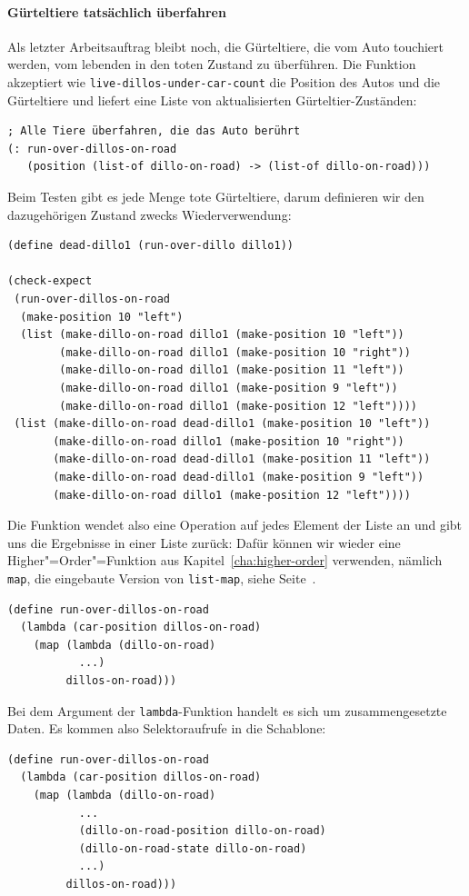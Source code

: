 \paragraph{Gürteltiere tatsächlich überfahren} Als letzter
Arbeitsauftrag bleibt noch, die Gürteltiere, die vom Auto touchiert
werden, vom lebenden in den toten Zustand zu überführen.  Die Funktion
akzeptiert wie \lstinline{live-dillos-under-car-count} die Position
des Autos und die Gürteltiere und liefert eine Liste von
aktualisierten Gürteltier-Zuständen:
%
\begin{lstlisting}
; Alle Tiere überfahren, die das Auto berührt
(: run-over-dillos-on-road
   (position (list-of dillo-on-road) -> (list-of dillo-on-road)))
\end{lstlisting}
%
Beim Testen gibt es jede Menge tote Gürteltiere, darum definieren wir
den dazugehörigen Zustand zwecks Wiederverwendung:
%
\begin{lstlisting}
(define dead-dillo1 (run-over-dillo dillo1))

(check-expect
 (run-over-dillos-on-road
  (make-position 10 "left")
  (list (make-dillo-on-road dillo1 (make-position 10 "left"))
        (make-dillo-on-road dillo1 (make-position 10 "right"))
        (make-dillo-on-road dillo1 (make-position 11 "left"))
        (make-dillo-on-road dillo1 (make-position 9 "left"))
        (make-dillo-on-road dillo1 (make-position 12 "left"))))
 (list (make-dillo-on-road dead-dillo1 (make-position 10 "left"))
       (make-dillo-on-road dillo1 (make-position 10 "right"))
       (make-dillo-on-road dead-dillo1 (make-position 11 "left"))
       (make-dillo-on-road dead-dillo1 (make-position 9 "left"))
       (make-dillo-on-road dillo1 (make-position 12 "left"))))
\end{lstlisting}
%
Die Funktion wendet also eine Operation auf jedes Element der Liste an
und gibt uns die Ergebnisse in einer Liste zurück: Dafür können wir
wieder eine Higher"=Order"=Funktion aus Kapitel~\ref{cha:higher-order}
verwenden, nämlich \lstinline{map}, die eingebaute Version von
\lstinline{list-map}, siehe Seite~\pageref{func:map}.
%
\begin{lstlisting}
(define run-over-dillos-on-road
  (lambda (car-position dillos-on-road)
    (map (lambda (dillo-on-road)
           ...)
         dillos-on-road)))
\end{lstlisting}
%
Bei dem Argument der \lstinline{lambda}-Funktion handelt es sich um
zusammengesetzte Daten.  Es kommen also Selektoraufrufe in die
Schablone:
%
\begin{lstlisting}
(define run-over-dillos-on-road
  (lambda (car-position dillos-on-road)
    (map (lambda (dillo-on-road)
           ...
           (dillo-on-road-position dillo-on-road)
           (dillo-on-road-state dillo-on-road)
           ...)
         dillos-on-road)))
\end{lstlisting}
